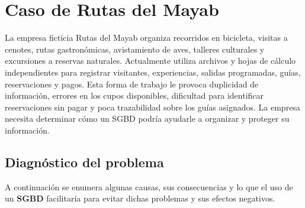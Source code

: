 \documentclass[12pt]{article}
\begin{document}
\section*{\centering Caso de Rutas del Mayab}

La empresa ficticia Rutas del Mayab organiza recorridos en bicicleta, visitas a cenotes, rutas gastronómicas, avistamiento de aves, talleres culturales y excursiones a reservas naturales. Actualmente utiliza archivos y hojas de cálculo independientes para registrar visitantes, experiencias, salidas programadas, guías, reservaciones y pagos. Esta forma de trabajo le provoca duplicidad de información, errores en los cupos disponibles, dificultad para identificar reservaciones sin pagar y poca trazabilidad sobre los guías asignados. La empresa
necesita determinar cómo un SGBD podría ayudarle a organizar y proteger su información.


\subsection*{Diagnóstico del problema}

A continuación se enumera algunas causas, sus consecuencias y lo que el uso de un \textbf{SGBD} facilitaría para evitar dichas problemas y sus efectos negativos.
\end{document}
